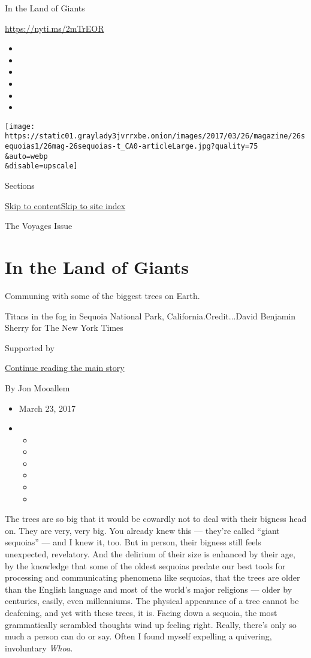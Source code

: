 In the Land of Giants

\url{https://nyti.ms/2mTrEOR}

\begin{itemize}
\item
\item
\item
\item
\item
\item
\end{itemize}

\texttt{[image: https://static01.graylady3jvrrxbe.onion/images/2017/03/26/magazine/26sequoias1/26mag-26sequoias-t\_CA0-articleLarge.jpg?quality=75\\\&auto=webp\\\&disable=upscale]}

Sections

\protect\hyperlink{site-content}{Skip to
content}\protect\hyperlink{site-index}{Skip to site index}

The Voyages Issue

\hypertarget{in-the-land-of-giants}{%
\section{In the Land of Giants}\label{in-the-land-of-giants}}

Communing with some of the biggest trees on Earth.

Titans in the fog in Sequoia National Park, California.Credit...David
Benjamin Sherry for The New York Times

Supported by

\protect\hyperlink{after-sponsor}{Continue reading the main story}

By Jon Mooallem

\begin{itemize}
\item
  March 23, 2017
\item
  \begin{itemize}
  \item
  \item
  \item
  \item
  \item
  \item
  \end{itemize}
\end{itemize}

The trees are so big that it would be cowardly not to deal with their
bigness head on. They are very, very big. You already knew this ---
they're called ``giant sequoias'' --- and I knew it, too. But in person,
their bigness still feels unexpected, revelatory. And the delirium of
their size is enhanced by their age, by the knowledge that some of the
oldest sequoias predate our best tools for processing and communicating
phenomena like sequoias, that the trees are older than the English
language and most of the world's major religions --- older by centuries,
easily, even millenniums. The physical appearance of a tree cannot be
deafening, and yet with these trees, it is. Facing down a sequoia, the
most grammatically scrambled thoughts wind up feeling right. Really,
there's only so much a person can do or say. Often I found myself
expelling a quivering, involuntary \emph{Whoa.}

